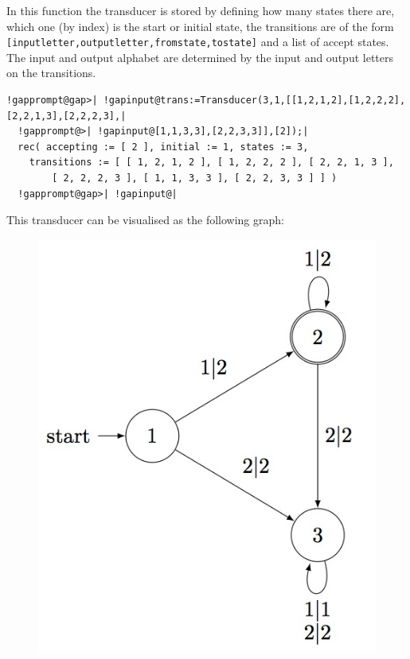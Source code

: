 \documentclass[a4paper,11pt]{report}
\begin{document}
{{{ In this function the transducer is stored by defining how many states there
are, which one (by index) is the start or initial state, the transitions are
of the form \texttt{[inputletter,outputletter,fromstate,tostate]} and a list of accept states. The input and output alphabet are determined by
the input and output letters on the transitions. 
\begin{Verbatim}[commandchars=!@|,fontsize=\small,frame=single,label=Example]
  !gapprompt@gap>| !gapinput@trans:=Transducer(3,1,[[1,2,1,2],[1,2,2,2],[2,2,1,3],[2,2,2,3],|
  !gapprompt@>| !gapinput@[1,1,3,3],[2,2,3,3]],[2]);|
  rec( accepting := [ 2 ], initial := 1, states := 3, 
    transitions := [ [ 1, 2, 1, 2 ], [ 1, 2, 2, 2 ], [ 2, 2, 1, 3 ], 
        [ 2, 2, 2, 3 ], [ 1, 1, 3, 3 ], [ 2, 2, 3, 3 ] ] )
  !gapprompt@gap>| !gapinput@|
\end{Verbatim}
  This transducer can be visualised as the following graph: \begin{figure}[H]
\begin{center} \leavevmode \includegraphics[scale=0.75]{img/trans.jpg}
\end{center} \end{figure}   }

}}
\end{document}
